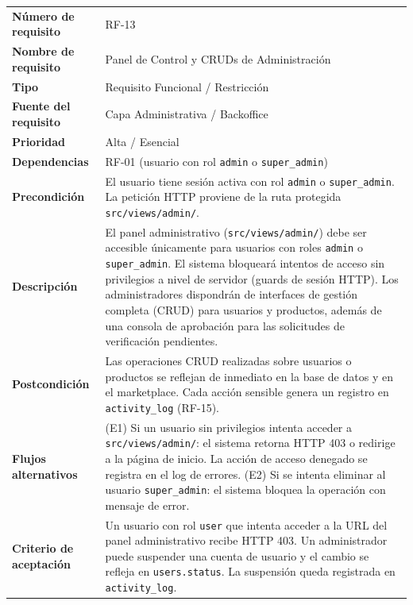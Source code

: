 \documentclass[11pt,a4paper]{report}
\begin{document}
\begin{table}[H]
\centering
\begin{tabularx}{\textwidth}{|l|L|}
\hline
{} \\ \hline
\textbf{Número de requisito} & RF-13 \\ \hline
\textbf{Nombre de requisito} & Panel de Control y CRUDs de Administración \\ \hline
\textbf{Tipo} & Requisito Funcional / Restricción \\ \hline
\textbf{Fuente del requisito} & Capa Administrativa / Backoffice \\ \hline
\textbf{Prioridad} & Alta / Esencial \\ \hline
\textbf{Dependencias} & RF-01 (usuario con rol \texttt{admin} o \texttt{super\_admin}) \\ \hline
\textbf{Precondición} & El usuario tiene sesión activa con rol \texttt{admin} o \texttt{super\_admin}. La petición HTTP proviene de la ruta protegida \texttt{src/views/admin/}. \\ \hline
\textbf{Descripción} & El panel administrativo (\texttt{src/views/admin/}) debe ser accesible únicamente para usuarios con roles \texttt{admin} o \texttt{super\_admin}. El sistema bloqueará intentos de acceso sin privilegios a nivel de servidor (guards de sesión HTTP). Los administradores dispondrán de interfaces de gestión completa (CRUD) para usuarios y productos, además de una consola de aprobación para las solicitudes de verificación pendientes. \\ \hline
\textbf{Postcondición} & Las operaciones CRUD realizadas sobre usuarios o productos se reflejan de inmediato en la base de datos y en el marketplace. Cada acción sensible genera un registro en \texttt{activity\_log} (RF-15). \\ \hline
\textbf{Flujos alternativos} & (E1) Si un usuario sin privilegios intenta acceder a \texttt{src/views/admin/}: el sistema retorna HTTP 403 o redirige a la página de inicio. La acción de acceso denegado se registra en el log de errores. (E2) Si se intenta eliminar al usuario \texttt{super\_admin}: el sistema bloquea la operación con mensaje de error. \\ \hline
\textbf{Criterio de aceptación} & Un usuario con rol \texttt{user} que intenta acceder a la URL del panel administrativo recibe HTTP 403. Un administrador puede suspender una cuenta de usuario y el cambio se refleja en \texttt{users.status}. La suspensión queda registrada en \texttt{activity\_log}. \\ \hline
\end{tabularx}
\end{table}
\end{document}
